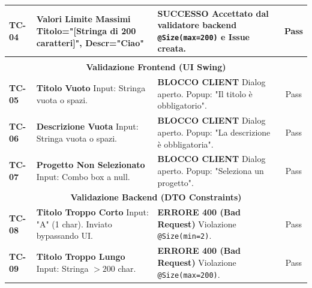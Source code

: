 \documentclass[a4paper,12pt]{article}
\begin{document}
\begin{longtable}{|p{1.2cm}|p{6.0cm}|p{5.5cm}|c|}
    \textbf{TC-04} & 
    \textbf{Valori Limite Massimi} \newline
    Titolo="[Stringa di 200 caratteri]", \newline Descr="Ciao" & 
    \textbf{SUCCESSO} \newline
    Accettato dal validatore backend \texttt{@Size(max=200)} e Issue creata. & 
    Pass \\ \hline
    \multicolumn{4}{|c|}{\cellcolor{white}\textbf{}} \\ \hline
    
    \multicolumn{4}{|c|}{\cellcolor{BoxLight}\textbf{Validazione Frontend (UI Swing)}} \\ \hline

    \textbf{TC-05} & 
    \textbf{Titolo Vuoto} \newline
    Input: Stringa vuota o spazi. & 
    \textbf{BLOCCO CLIENT} \newline
    Dialog aperto. Popup: "Il titolo è obbligatorio". & 
    Pass \\ \hline

    \textbf{TC-06} & 
    \textbf{Descrizione Vuota} \newline
    Input: Stringa vuota o spazi. & 
    \textbf{BLOCCO CLIENT} \newline
    Dialog aperto. Popup: "La descrizione è obbligatoria". & 
    Pass \\ \hline

    \textbf{TC-07} & 
    \textbf{Progetto Non Selezionato} \newline
    Input: Combo box a null. & 
    \textbf{BLOCCO CLIENT} \newline
    Dialog aperto. Popup: "Seleziona un progetto". & 
    Pass \\ \hline

    \multicolumn{4}{|c|}{\cellcolor{BoxLight}\textbf{Validazione Backend (DTO Constraints)}} \\ \hline

    \textbf{TC-08} & 
    \textbf{Titolo Troppo Corto} \newline
    Input: "A" (1 char). Inviato bypassando UI. & 
    \textbf{ERRORE 400 (Bad Request)} \newline
    Violazione \texttt{@Size(min=2)}. & 
    Pass \\ \hline

    \textbf{TC-09} & 
    \textbf{Titolo Troppo Lungo} \newline
    Input: Stringa $>200$ char. & 
    \textbf{ERRORE 400 (Bad Request)} \newline
    Violazione \texttt{@Size(max=200)}. & 
    Pass \\ \hline


\end{longtable}
\end{document}
